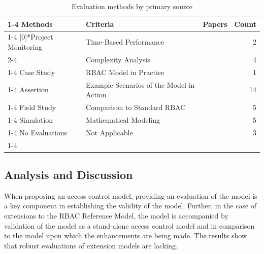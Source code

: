 \begin{table}
\centering
\caption{Evaluation methods by primary source}
\vspace{0.1 in}
\begin{tabular*}{.9\linewidth}{| p{.2\linewidth}| p{.35\linewidth} | p{.2\linewidth} | r | }
\cline{1-4}
\textbf{Methods} & \textbf{Criteria} & \textbf{Papers} & \textbf{Count} \\ \cline{1-4}
\multirow{2}[0]{*}{Project Monitoring}
&
Time-Based Performance
&
\cite{ni2010privacy}
\cite{aich09:role}
&
2 \\ \cline{2-4}

&
Complexity Analysis
&
\cite{bao08:role}
\cite{zhang06:collaborative}
\cite{aich07:STARBAC}
\cite{chen08:spatio-temporal}
&
4 \\ 
\cline{1-4}
Case Study
&
RBAC Model in Practice
&
\cite{motta03:contextual}
&
1 \\ \cline{1-4}
Assertion
&
Example Scenarios of the Model in Action
&
\cite{jian2008extended}
\cite{yao2008task}
\cite{cholewka00:acontext-sensitive}
\cite{huang06:pervasive}
\cite{bao08:role}
\cite{zhou2007team} 
\cite{alam06:constraint}
\cite{tzelepi01:flexible}
\cite{yamazaki04:designing}
\cite{zou2009crbac}
\cite{samuel07:spatio-temporal}
\cite{ray07:spatio}
\cite{joshi05:generalized}
\cite{oh2003task}
&
14 \\ \cline{1-4}
Field Study
&
Comparison to Standard RBAC
&  
\cite{bao08:role}
\cite{zou2009crbac}
\cite{zhang06:collaborative}
\cite{ray07:spatio}
\cite{zhao2008flexible}
&
5 \\ \cline{1-4}
Simulation
&
Mathematical Modeling
&  
\cite{damiani2007geo}
\cite{hansen2003spatial}
\cite{aich07:STARBAC}
\cite{chen08:spatio-temporal}
\cite{joshi05:generalized}
&
5 \\ \cline{1-4}
No Evaluations
&
Not Applicable
&
\cite{masoumzadeh2008purbac}
\cite{ray2006lrbac}
\cite{chandran05:llt}
&
3 \\ \cline{1-4}

\end{tabular*}
\label{tab:evaluations}
\end{table}

\subsection{Analysis and Discussion}

  
When proposing an access control model, providing an evaluation of the model is a key component in establishing the validity of the model. 
Further, in the case of extensions to the RBAC Reference Model, the model is accompanied by validation of the model as a stand-alone
access control model and in comparison to the model upon which the enhancements are being made. The results show that robust evaluations of
extension models are lacking. 

